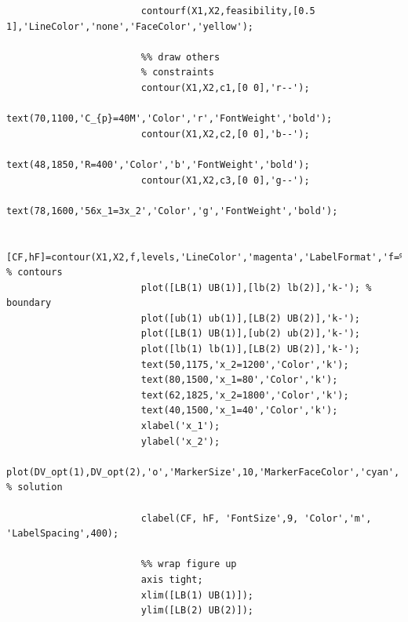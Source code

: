 \documentclass[11pt,twocolumn]{article}
\begin{document}
\begin{enumerate}
\begin{lstlisting}[firstnumber=last]
                        %% draw feasible region
                        contourf(X1,X2,feasibility,[0.5 1],'LineColor','none','FaceColor','yellow');

                        %% draw others
                        % constraints
                        contour(X1,X2,c1,[0 0],'r--');
                        text(70,1100,'C_{p}=40M','Color','r','FontWeight','bold');
                        contour(X1,X2,c2,[0 0],'b--');
                        text(48,1850,'R=400','Color','b','FontWeight','bold');
                        contour(X1,X2,c3,[0 0],'g--');
                        text(78,1600,'56x_1=3x_2','Color','g','FontWeight','bold');

                        [CF,hF]=contour(X1,X2,f,levels,'LineColor','magenta','LabelFormat','f=%.1f'); % contours
                        plot([LB(1) UB(1)],[lb(2) lb(2)],'k-'); % boundary
                        plot([ub(1) ub(1)],[LB(2) UB(2)],'k-');
                        plot([LB(1) UB(1)],[ub(2) ub(2)],'k-');
                        plot([lb(1) lb(1)],[LB(2) UB(2)],'k-');
                        text(50,1175,'x_2=1200','Color','k');
                        text(80,1500,'x_1=80','Color','k');
                        text(62,1825,'x_2=1800','Color','k');
                        text(40,1500,'x_1=40','Color','k');
                        xlabel('x_1');
                        ylabel('x_2');
                        plot(DV_opt(1),DV_opt(2),'o','MarkerSize',10,'MarkerFaceColor','cyan','MarkerEdgeColor','k','LineWidth',2); % solution

                        clabel(CF, hF, 'FontSize',9, 'Color','m', 'LabelSpacing',400);

                        %% wrap figure up
                        axis tight;
                        xlim([LB(1) UB(1)]);
                        ylim([LB(2) UB(2)]);
                    \end{lstlisting}
                \end{enumerate}
\end{document}
